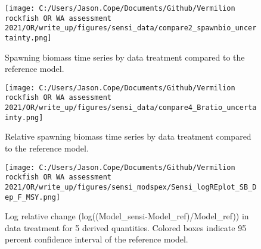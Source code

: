 \documentclass[11pt,
  english,
  a4paper,
]{article}
\begin{document}
\tagmcend\tagstructend


\begin{figure}
\centering
\texttt{[image: C:/Users/Jason.Cope/Documents/Github/Vermilion rockfish OR WA assessment 2021/OR/write\_up/figures/sensi\_data/compare2\_spawnbio\_uncertainty.png]}
\caption{Spawning biomass time series by data treatment compared to the reference model.\label{fig:sensi-data-ssb}}
\end{figure}

\tagmcend\tagstructend


\begin{figure}
\centering
\texttt{[image: C:/Users/Jason.Cope/Documents/Github/Vermilion rockfish OR WA assessment 2021/OR/write\_up/figures/sensi\_data/compare4\_Bratio\_uncertainty.png]}
\caption{Relative spawning biomass time series by data treatment compared to the reference model.\label{fig:sensi-data-depl}}
\end{figure}

\tagmcend\tagstructend


\begin{figure}
\centering
\texttt{[image: C:/Users/Jason.Cope/Documents/Github/Vermilion rockfish OR WA assessment 2021/OR/write\_up/figures/sensi\_modspex/Sensi\_logREplot\_SB\_Dep\_F\_MSY.png]}
\caption{Log relative change (log((Model\_sensi-Model\_ref)/Model\_ref)) in data treatment for 5 derived quantities. Colored boxes indicate 95 percent confidence interval of the reference model.\label{fig:sensi-modspec-RE}}
\end{figure}

\tagmcend\tagstructend

\end{document}
